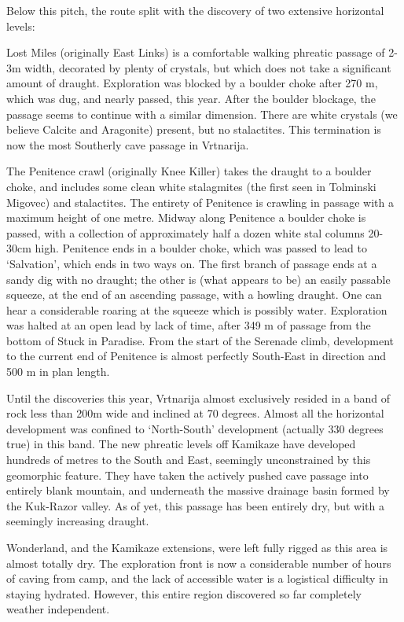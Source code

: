 Below this pitch, the route split with the discovery of two extensive
horizontal levels:

Lost Miles (originally East Links) is a comfortable walking phreatic
passage of 2-3m width, decorated by plenty of crystals, but which does
not take a significant amount of draught. Exploration was blocked by a
boulder choke after 270 m, which was dug, and nearly passed, this year.
After the boulder blockage, the passage seems to continue with a similar
dimension. There are white crystals (we believe Calcite and Aragonite)
present, but no stalactites. This termination is now the most Southerly
cave passage in Vrtnarija.

The Penitence crawl (originally Knee Killer) takes the draught to a
boulder choke, and includes some clean white stalagmites (the first seen
in Tolminski Migovec) and stalactites. The entirety of Penitence is
crawling in passage with a maximum height of one metre. Midway along
Penitence a boulder choke is passed, with a collection of approximately
half a dozen white stal columns 20-30cm high. Penitence ends in a
boulder choke, which was passed to lead to `Salvation', which ends in
two ways on. The first branch of passage ends at a sandy dig with no
draught; the other is (what appears to be) an easily passable squeeze,
at the end of an ascending passage, with a howling draught. One can hear
a considerable roaring at the squeeze which is possibly water.
Exploration was halted at an open lead by lack of time, after 349 m of
passage from the bottom of Stuck in Paradise. From the start of the
Serenade climb, development to the current end of Penitence is almost
perfectly South-East in direction and 500 m in plan length.

Until the discoveries this year, Vrtnarija almost exclusively resided in
a band of rock less than 200m wide and inclined at 70 degrees. Almost
all the horizontal development was confined to `North-South' development
(actually 330 degrees true) in this band. The new phreatic levels off
Kamikaze have developed hundreds of metres to the South and East,
seemingly unconstrained by this geomorphic feature. They have taken the
actively pushed cave passage into entirely blank mountain, and
underneath the massive drainage basin formed by the Kuk-Razor valley. As
of yet, this passage has been entirely dry, but with a seemingly
increasing draught.

Wonderland, and the Kamikaze extensions, were left fully rigged as this
area is almost totally dry. The exploration front is now a considerable
number of hours of caving from camp, and the lack of accessible water is
a logistical difficulty in staying hydrated. However, this entire region
discovered so far completely weather independent.

